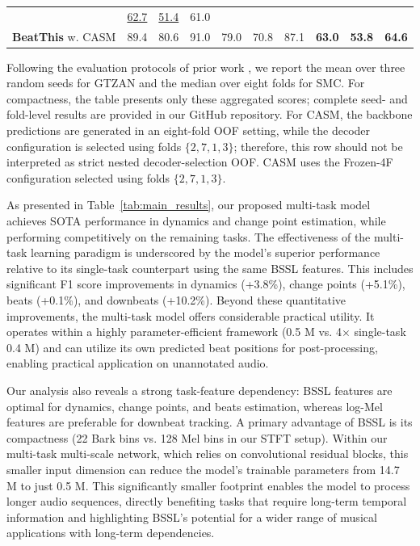 \documentclass{article}
\begin{document}
\begin{table}[t]
{\begin{tabular}{l|ccc|ccc|ccc}
& \underline{62.7} & \underline{51.4} & 61.0 \\
\rowcolor{gray!10}
\textbf{BeatThis} w. CASM
& 89.4 & 80.6 & 91.0
& 79.0 & 70.8 & 87.1
& \textbf{63.0} & \textbf{53.8} & \textbf{64.6} \\
\bottomrule
\end{tabular}%
}
\vspace{2pt}
\begin{minipage}{0.99\columnwidth}
\footnotesize
Following the evaluation protocols of prior work
\cite{foscarin2024beat, ru2025hingenet, ru2025beatfm}, we report the mean over three random seeds for GTZAN and the median over eight folds for SMC. For compactness, the table presents only these aggregated scores; complete seed- and fold-level results are provided in our GitHub repository. For CASM, the backbone predictions are generated in an eight-fold OOF setting, while the decoder configuration is selected using folds $\{2,7,1,3\}$; therefore, this row should not be interpreted as strict nested decoder-selection OOF. CASM uses the Frozen-4F configuration selected using folds $\{2,7,1,3\}$.
\end{minipage}
\endgroup
\end{table}


As presented in Table~\ref{tab:main_results}, our proposed multi-task model achieves SOTA performance in dynamics and change point estimation, while performing competitively on the remaining tasks. The effectiveness of the multi-task learning paradigm is underscored by the model's superior performance relative to its single-task counterpart using the same BSSL features. This includes significant F1 score improvements in dynamics (+3.8\%), change points (+5.1\%), beats (+0.1\%), and downbeats (+10.2\%). Beyond these quantitative improvements, the multi-task model offers considerable practical utility. It operates within a highly parameter-efficient framework (0.5 M vs. 4$\times$ single-task 0.4 M) and can utilize its own predicted beat positions for post-processing, enabling practical application on unannotated audio.

Our analysis also reveals a strong task-feature dependency: BSSL features are optimal for dynamics, change points, and beats estimation, whereas log-Mel features are preferable for downbeat tracking. A primary advantage of BSSL is its compactness (22 Bark bins vs. 128 Mel bins in our STFT setup). Within our multi-task multi-scale network, which relies on convolutional residual blocks, this smaller input dimension can reduce the model's trainable parameters from 14.7 M to just 0.5 M. This significantly smaller footprint enables the model to process longer audio sequences, directly benefiting tasks that require long-term temporal information and highlighting BSSL's potential for a wider range of musical applications with long-term dependencies.
\end{document}
